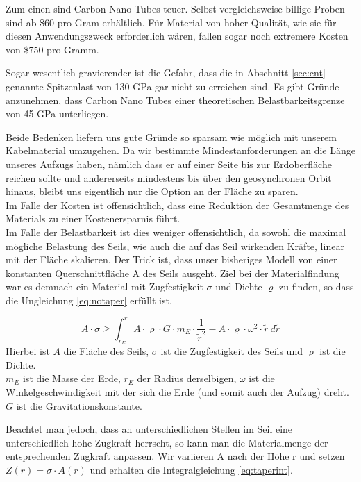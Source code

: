 \documentclass[a4paper, 10pt]{report}
\begin{document}
Zum einen sind Carbon Nano Tubes teuer. Selbst vergleichsweise billige Proben sind ab \$60 pro Gram erhältlich. Für Material von hoher Qualität, wie sie für diesen Anwendungszweck erforderlich wären, fallen sogar noch extremere Kosten von \$750 pro Gramm\cite{baughman2002carbon}.

Sogar wesentlich gravierender ist die Gefahr, dass die in Abschnitt \ref{sec:cnt} genannte Spitzenlast von 130 GPa gar nicht zu erreichen sind. Es gibt Gründe anzunehmen, dass Carbon Nano Tubes einer theoretischen Belastbarkeitsgrenze von 45 GPa unterliegen\cite{pugno2007space}.

Beide Bedenken liefern uns gute Gründe so sparsam wie möglich mit unserem Kabelmaterial umzugehen. Da wir bestimmte Mindestanforderungen an die Länge unseres Aufzugs haben, nämlich dass er auf einer Seite bis zur Erdoberfläche reichen sollte und andererseits mindestens bis über den geosynchronen Orbit hinaus, bleibt uns eigentlich nur die Option an der Fläche zu sparen.\\
Im Falle der Kosten ist offensichtlich, dass eine Reduktion der Gesamtmenge des Materials zu einer Kostenersparnis führt.\\
Im Falle der Belastbarkeit ist dies weniger offensichtlich, da sowohl die maximal mögliche Belastung des Seils, wie auch die auf das Seil wirkenden Kräfte, linear mit der Fläche skalieren. Der Trick ist, dass unser bisheriges Modell von einer konstanten Querschnittfläche A des Seils ausgeht. Ziel bei der Materialfindung war es demnach ein Material mit Zugfestigkeit $\sigma$ und Dichte $\varrho$ zu finden, so dass die Ungleichung \ref{eq:notaper} erfüllt ist.

\begin{equation}
A \cdot \sigma \geq \int_{r_E}^{r} A \cdot \varrho \cdot G \cdot m_E \cdot \frac{1}{\tilde{r}^2} - A \cdot \varrho \cdot \omega^2 \cdot \tilde{r}\ d\tilde{r}
\label{eq:notaper}
\end{equation}
Hierbei ist $A$ die Fläche des Seils, $\sigma$ ist die Zugfestigkeit des Seils und $\varrho$ ist die Dichte.\\
$m_E$ ist die Masse der Erde, $r_E$ der Radius derselbigen, $\omega$ ist die Winkelgeschwindigkeit mit der sich die Erde (und somit auch der Aufzug) dreht.\\
$G$ ist die Gravitationskonstante.

Beachtet man jedoch, dass an unterschiedlichen Stellen im Seil eine unterschiedlich hohe Zugkraft herrscht, so kann man die Materialmenge der entsprechenden Zugkraft anpassen.
Wir variieren A nach der Höhe r und setzen $Z(r) = \sigma \cdot A(r)$ und erhalten die Integralgleichung \ref{eq:taperint}.
\end{document}
